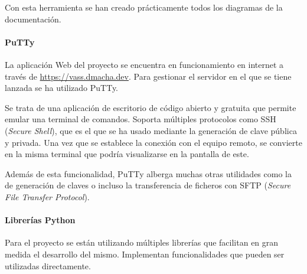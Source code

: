 Con esta herramienta se han creado prácticamente todos los diagramas de la
documentación.

\paragraph{PuTTy}
La aplicación Web del proyecto se encuentra en funcionamiento en internet a
través de \url{https://vass.dmacha.dev}. Para gestionar el servidor en el que se
tiene lanzada se ha utilizado PuTTy.

Se trata de una aplicación de escritorio de código abierto y gratuita que
permite emular una terminal de comandos. Soporta múltiples protocolos como SSH
(\textit{Secure Shell}), que es el que se ha usado mediante la generación de
clave pública y privada. Una vez que se establece la conexión con el equipo
remoto, se convierte en la misma terminal que podría visualizarse en la pantalla
de este.

Además de esta funcionalidad, PuTTy alberga muchas otras utilidades como la de
generación de claves o incluso la transferencia de ficheros con SFTP
(\textit{Secure File Transfer Protocol}).

\paragraph{Librerías Python}
Para el proyecto se están utilizando múltiples librerías que facilitan en gran
medida el desarrollo del mismo. Implementan funcionalidades que pueden ser
utilizadas directamente.

